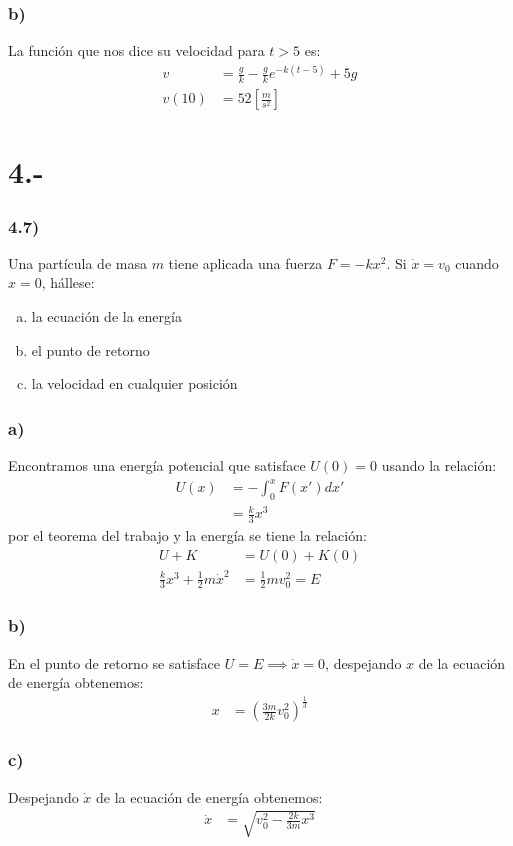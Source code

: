 \documentclass{article}
\begin{document}
\begin{tcolorbox}[breakable]
    \subsubsection*{b)}
    La función que nos dice su velocidad para $t>5$ es:
    \begin{align*}
        v 
        &= \frac{g}{k} - \frac{g}{k}e^{-k(t-5)} + 5g \\ 
        v(10)
        &= 52 \left[ \frac{m}{s^2} \right]
    \end{align*}
\end{tcolorbox}

\section*{4.-}
\subsubsection*{4.7)}
Una partícula de masa $m$ tiene aplicada una fuerza $F=-kx^2$. Si $\dot{x} = v_0$ 
cuando $x=0$, hállese:
\begin{enumerate}[a)]
    \item la ecuación de la energía
    \item el punto de retorno
    \item la velocidad en cualquier posición
\end{enumerate} 
\begin{tcolorbox}[breakable]
    \subsubsection*{a)}
    Encontramos una energía potencial que satisface $U(0) = 0$ usando la relación:
    \begin{align*}
        U(x)
        &= -\int_0^x F(x')dx' \\
        &= \frac{k}{3}x^3  
    \end{align*}
    por el teorema del trabajo y la energía se tiene la relación:
    \begin{align*}
        U + K &= U(0) + K(0) \\
        \frac{k}{3}x^3 + \frac{1}{2}m\dot{x}^2 &= \frac{1}{2}mv_0^2 = E
    \end{align*}
    \subsubsection*{b)}
    En el punto de retorno se satisface $U = E \implies \dot{x} = 0$, 
    despejando $x$ de la ecuación de energía obtenemos:
    \begin{align*}
        x &= \left(\frac{3m}{2k}v_0^2\right)^{\frac{1}{3}}
    \end{align*} 
    \subsubsection*{c)}
    Despejando $\dot{x}$ de la ecuación de energía obtenemos:
    \begin{align*}
        \dot{x} &= \sqrt{v_0^2 - \frac{2k}{3m}x^3}
    \end{align*} 
\end{tcolorbox}
\end{document}
